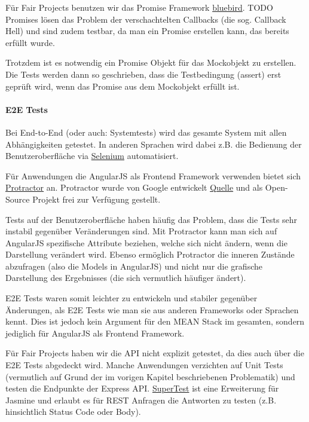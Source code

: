 Für Fair Projects benutzen wir das Promise Framework
\href{http://bluebirdjs.com/}{bluebird}. TODO Promises lösen das Problem
der verschachtelten Callbacks (die sog. Callback Hell) und sind zudem
testbar, da man ein Promise erstellen kann, das bereits erfüllt wurde.

Trotzdem ist es notwendig ein Promise Objekt für das Mockobjekt zu
erstellen. Die Tests werden dann so geschrieben, dass die Testbedingung
(assert) erst geprüft wird, wenn das Promise aus dem Mockobjekt erfüllt
ist.

\paragraph{E2E Tests}\label{e2e-tests}

Bei End-to-End (oder auch: Systemtests) wird das gesamte System mit
allen Abhängigkeiten getestet. In anderen Sprachen wird dabei z.B. die
Bedienung der Benutzeroberfläche via
\href{http://www.seleniumhq.org/}{Selenium} automatisiert.

Für Anwendungen die AngularJS als Frontend Framework verwenden bietet
sich \href{http://www.protractortest.org/}{Protractor} an. Protractor
wurde von Google entwickelt
\href{http://googletesting.blogspot.de/2014/11/protractor-angular-testing-made-easy.html}{Quelle}
und als Open-Source Projekt frei zur Verfügung gestellt.

Tests auf der Benutzeroberfläche haben häufig das Problem, dass die
Tests sehr instabil gegenüber Veränderungen sind. Mit Protractor kann
man sich auf AngularJS spezifische Attribute beziehen, welche sich nicht
ändern, wenn die Darstellung verändert wird. Ebenso ermöglich Protractor
die inneren Zustände abzufragen (also die Models in AngularJS) und nicht
nur die grafische Darstellung des Ergebnisses (die sich vermutlich
häufiger ändert).

E2E Tests waren somit leichter zu entwickeln und stabiler gegenüber
Änderungen, als E2E Tests wie man sie aus anderen Frameworks oder
Sprachen kennt. Dies ist jedoch kein Argument für den MEAN Stack im
gesamten, sondern jediglich für AngularJS als Frontend Framework.

Für Fair Projects haben wir die API nicht explizit getestet, da dies
auch über die E2E Tests abgedeckt wird. Manche Anwendungen verzichten
auf Unit Tests (vermutlich auf Grund der im vorigen Kapitel
beschriebenen Problematik) und testen die Endpunkte der Express API.
\href{https://github.com/visionmedia/supertest}{SuperTest} ist eine
Erweiterung für Jasmine und erlaubt es für REST Anfragen die Antworten
zu testen (z.B. hinsichtlich Status Code oder Body).

